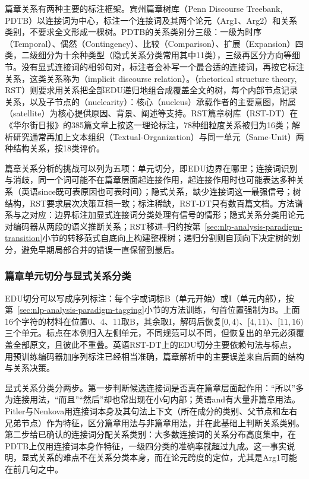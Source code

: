 篇章关系有两种主要的标注框架。宾州篇章树库（Penn Discourse Treebank, PDTB）以连接词为中心，标注一个连接词及其两个论元（Arg1、Arg2）和关系类别，不要求全文形成一棵树。PDTB的关系类别分三级：一级为时序（Temporal）、偶然（Contingency）、比较（Comparison）、扩展（Expansion）四类，二级细分为十余种类型（隐式关系分类常用其中11类），三级再区分方向等细节。没有显式连接词的相邻句对，标注者会补写一个最合适的连接词，再按它标注关系，这类关系称为（implicit discourse relation）。（rhetorical structure theory, RST）则要求用关系把全部EDU递归地组合成覆盖全文的树，每个内部节点记录关系，以及子节点的（nuclearity）：核心（nucleus）承载作者的主要意图，附属（satellite）为核心提供原因、背景、阐述等支持。RST篇章树库（RST-DT）在《华尔街日报》的385篇文章上按这一理论标注，78种细粒度关系被归为16类；解析研究通常再加上文本组织（Textual-Organization）与同一单元（Same-Unit）两种结构关系，按18类评价。

篇章关系分析的挑战可以列为五项：单元切分，即EDU边界在哪里；连接词识别与消歧，同一个词可能不在篇章层面起连接作用，起连接作用时也可能表达多种关系（英语since既可表原因也可表时间）；隐式关系，缺少连接词这一最强信号；树结构，RST要求层次决策互相一致；标注稀缺，RST-DT只有数百篇文档。方法谱系与之对应：边界标注加显式连接词分类处理有信号的情形；隐式关系分类用论元对编码器从两段的语义推断关系；RST移进--归约按第~\ref{sec:nlp-analysis-paradigm-transition}小节的转移范式自底向上构建整棵树；递归分割则自顶向下决定树的划分，避免早期局部合并的错误一直保留到最后。

\subsubsection{篇章单元切分与显式关系分类}
\label{sec:nlp-analysis-discourse-boundary}

EDU切分可以写成序列标注：每个字或词标B（单元开始）或I（单元内部），按第~\ref{sec:nlp-analysis-paradigm-tagging}小节的方法训练，句首位置强制为B。上面16个字符的材料在位置0、4、11取B，其余取I，解码后恢复$[0,4)$、$[4,11)$、$[11,16)$三个单元。标点在本例归入左侧单元，不同规范可以不同，但恢复出的单元必须覆盖全部原文，且彼此不重叠。英语RST-DT上的EDU切分主要依赖句法与标点，用预训练编码器加序列标注已经相当准确，篇章解析中的主要误差来自后面的结构与关系决策。

显式关系分类分两步。第一步判断候选连接词是否真在篇章层面起作用：“所以”多为连接用法，“而且”“然后”却也常出现在小句内部；英语and有大量非篇章用法。Pitler与Nenkova用连接词本身及其句法上下文（所在成分的类别、父节点和左右兄弟节点）作为特征，区分篇章用法与非篇章用法，并在此基础上判断关系类别。第二步给已确认的连接词分配关系类别：大多数连接词的关系分布高度集中，在PDTB上仅用连接词本身作特征，一级四分类的准确率就超过九成。这一事实说明，显式关系的难点不在关系分类本身，而在论元跨度的定位，尤其是Arg1可能在前几句之中。

